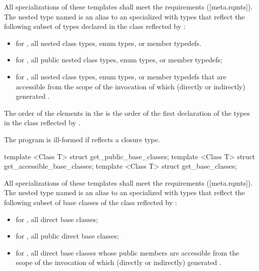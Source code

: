 \begin{std.txt}
\begin{itemdescr}
\pnum
All specializations of these templates shall meet the  requirements ([meta.rqmts]). The nested type named  is an alias to an  specialized with  types that reflect the following subset of types declared in the class reflected by :
\begin{itemize}
  \item for , all nested class types, enum types, or member typedefs.
  \item for , all public nested class types, enum types, or member typedefs;
  \item for , all nested class types, enum types, or member typedefs that are accessible from the scope of the invocation of  which (directly or indirectly) generated .
\end{itemize}

\pnum
The order of the elements in the  is the order of the first declaration of the types in the class reflected by .

\pnum
\remarks
The program is ill-formed if  reflects a closure type.
\end{itemdescr}

\begin{itemdecl}
template <Class T> struct get_public_base_classes;
template <Class T> struct get_accessible_base_classes;
template <Class T> struct get_base_classes;
\end{itemdecl}

\begin{itemdescr}
\pnum
All specializations of these templates shall meet the  requirements ([meta.rqmts]). The nested type named  is an alias to an  specialized with  types that reflect the following subset of base classes of the class reflected by :
\begin{itemize}
  \item for , all direct base classes;
  \item for , all public direct base classes;
  \item for , all direct base classes whose public members are accessible from the scope of the invocation of  which (directly or indirectly) generated .
\end{itemize}


\end{itemdescr}
\end{std.txt}
